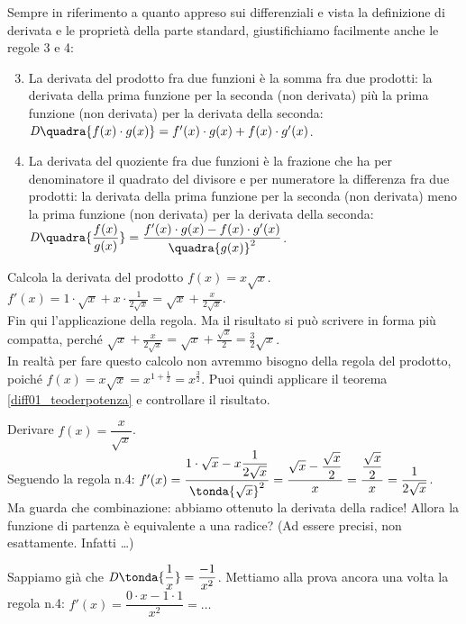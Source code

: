 Sempre in riferimento a quanto appreso sui differenziali 
e vista la definizione di derivata e le proprietà della parte standard, 
giustifichiamo facilmente anche le regole 3 e 4:
\begin{enumerate}[noitemsep]
\setcounter{enumi}{2}
\item La derivata del prodotto fra due funzioni è la somma fra due prodotti:
la derivata della prima funzione per la seconda (non derivata) più la prima 
funzione (non derivata) per la derivata della seconda:\\
$\mathit{D}\quadra{f(x)\cdot g(x)}=f'(x)\cdot g(x)+f(x)\cdot g'(x)$.
\item La derivata del quoziente fra due funzioni è la frazione che ha per 
denominatore il quadrato del divisore e per numeratore la differenza fra due
prodotti: la derivata della prima funzione per la seconda (non derivata) 
meno
la prima funzione (non derivata) per la derivata della seconda:\\
$\mathit{D}\quadra{\dfrac{f(x)}{g(x)}}=\dfrac{f'(x)\cdot g(x)-f(x)\cdot 
g'(x)}
  {\quadra{g(x)}^2}$.
\end{enumerate} 

\begin{esempio}
  Calcola la derivata del prodotto $f(x)=x\sqrt{x}$.\\
  $f'(x)=1\cdot \sqrt{x}+x\cdot\frac{1}{2\sqrt{x}}=
  \sqrt{x}+\frac{x}{2\sqrt{x}}$.\\
  Fin qui l'applicazione della regola. Ma il risultato si può scrivere 
  in forma più compatta, perché $\sqrt{x}+\frac{x}{2\sqrt{x}}=
  \sqrt{x}+\frac{\sqrt{x}}{2}=\frac{3}{2}\sqrt{x}$.\\
  In realtà per fare questo calcolo non avremmo bisogno della regola del 
  prodotto, poiché $f(x)=x\sqrt{x}=x^{1+\frac{1}{2}}=x^{\frac{3}{2}}$. Puoi 
  quindi applicare il teorema \ref{diff01_teoderpotenza} e controllare il 
  risultato.
\end{esempio}

\begin{esempio}
  Derivare $f(x)=\dfrac{x}{\sqrt{x}}$.\\
  Seguendo la regola n.4: $f'(x)= 
\dfrac{1\cdot\sqrt{x}-x\dfrac{1}{2\sqrt{x}}}
  {\tonda{\sqrt{x}}^2}=\dfrac{\sqrt{x}-\dfrac{\sqrt{x}}{2}}{x}=
  \dfrac{\dfrac{\sqrt{x}}{2}}{x}=\dfrac{1}{2\sqrt{x}}$.\\
  Ma guarda che combinazione: abbiamo ottenuto la derivata della radice! 
Allora 
  la funzione di partenza è equivalente a una radice? (Ad essere precisi, 
non 
  esattamente. Infatti \dots)
\end{esempio}
\begin{esempio}
  Sappiamo già che $\mathit{D}\tonda{\dfrac{1}{x}}=\dfrac{-1}{x^2}$. 
Mettiamo 
  alla prova ancora una volta la regola n.4: $f'(x)=\dfrac{0\cdot x-1\cdot 
1}
  {x^2}= \dots$
\end{esempio}

